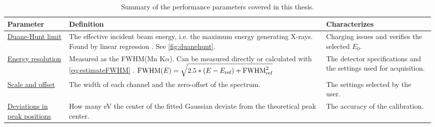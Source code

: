 \begin{table}[htp]
    \centering
    \caption{
        Summary of the performance parameters covered in this thesis.
    }
    \renewcommand*{\arraystretch}{1.4}
    \label{tab:eds_performance_parameters}
    \begin{tabular}{p{2.5cm}p{8cm}p{3.5cm}}
        \hline
        \textbf{Parameter}                                                          & \textbf{Definition}                                                                                                                                                                                                                                         & \textbf{Characterizes}                                             \\
        \hline
        \hyperref[theory:eds_performance:duanehunt]{Duane-Hunt limit}               & The effective incident beam energy, i.e. the maximum energy generating X-rays. Found by linear regression \cite{Duane_Hunt_1915,software_dtsaii,goldstein_scanning_2018}. See \cref{fig:duanehunt}.                                                         & Charging issues and verifies the selected $E_0$.                   \\
        \hyperref[theory:eds_performance:energyres]{Energy resolution}              & Measured as the FWHM(Mn K$\alpha$). Can be measured directly or calculated with \cref{eq:estimateFWHM} \cite[Ch. 16.1.1]{goldstein_scanning_2018}. $\textnormal{FWHM}(E) =  \sqrt{2.5 * (E - E_\textnormal{ref}) + \textnormal{FWHM}^2_{\textnormal{ref}}}$ & The detector specifications and the settings used for acquisition. \\
        \hyperref[theory:eds_performance:scaleoffset]{Scale and offset}             & The width of each channel and the zero-offset of the spectrum.                                                                                                                                                                                              & The settings selected by the user.                                 \\
        \hyperref[theory:eds_performance:scaleoffset]{Deviations in peak positions} & How many eV the center of the fitted Gaussian deviate from the theoretical peak center.                                                                                                                                                                     & The accuracy of the calibration.                                   \\

\end{tabular}
\end{table}
